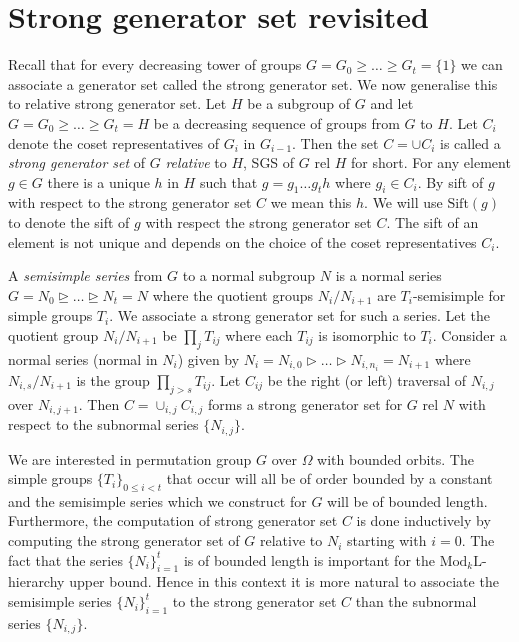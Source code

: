 \documentclass[11pt]{madras}%
\theoremstyle{remark}
\newcommand{\ModkL}[1]{{\ensuremath{\mathrm{Mod}_{#1}\mathrm{L}}}}
\newcommand{\Sift}[1]{{\ensuremath{\mathrm{Sift}({#1})}}}
\newcommand{\nomclgroups}[3][]{{\nomenclature[g#1]{#2}{#3}}}
\begin{document}
\section{Strong generator set revisited}\label{sect-generalised-sgs}

Recall that for every decreasing tower of groups $G = G_0 \geq \ldots
\geq G_t = \{ 1 \}$ we can associate a generator set called the strong
generator set. We now generalise this to relative strong generator
set. Let $H$ be a subgroup of $G$ and let $G = G_0 \geq \ldots \geq
G_t = H$ be a decreasing sequence of groups from $G$ to $H$. Let $C_i$
denote the coset representatives of $G_i$ in $G_{i-1}$. Then the set
$C = \cup C_i$ is called a \emph{strong generator set} of $G$
\emph{relative} to $H$, SGS of $G$ rel $H$ for short.  For any element
$g \in G$ there is a unique $h$ in $H$ such that $g = g_1\ldots g_t h$
where $g_i \in C_i$. By sift of $g$ with respect to the strong
generator set $C$ we mean this $h$. We will use $\Sift{g}$ to denote
the sift of $g$ with respect the strong generator set $C$. The sift of
an element is not unique and depends on the choice of the coset
representatives $C_i$.   
\nomclgroups{\Sift{g}}{The sift of $g$\refpage}

A \emph{semisimple series} from $G$ to a
normal subgroup $N$ is a normal series $G = N_0 \unrhd \ldots \unrhd
N_t = N$ where the quotient groups $N_i/N_{i+1}$ are $T_i$-semisimple
for simple groups $T_i$.  We associate a strong generator set for such
a series. Let the quotient group $N_i/N_{i+1}$ be $\prod_{j} T_{ij}$
where each $T_{ij}$ is isomorphic to $T_i$.  Consider a normal series
(normal in $N_i$) given by $N_i = N_{i,0} \rhd \ldots \rhd N_{i,n_i} =
N_{i+1}$ where $N_{i,s}/N_{i+1}$ is the  group $\prod_{j>s}
T_{ij}$. Let $C_{ij}$ be the right (or left) traversal of $N_{i,j}$
over $N_{i,j+1}$. Then $C = \cup_{i,j} C_{i,j}$ forms a strong
generator set for $G$ rel $N$ with respect to the subnormal series $\{
N_{i,j} \}$.



We are interested in permutation group $G$ over $\Omega$ with bounded
orbits. The simple groups $\{ T_i \}_{0 \leq i < t}$ that occur will
all be of order bounded by a constant and the semisimple series which
we construct for $G$ will be of bounded length.  Furthermore, the
computation of strong generator set $C$ is done inductively by
computing the strong generator set of $G$ relative to $N_i$ starting
with $i = 0$. The fact that the series $\{ N_i \}_{i=1}^t$ is of
bounded length is important for the $\ModkL{k}$-hierarchy upper bound.
Hence in this context it is more natural to associate the semisimple
series $\{ N_i\}_{i=1}^t$ to the strong generator set $C$ than the
subnormal series $\{ N_{i,j}\}$.
\end{document}
